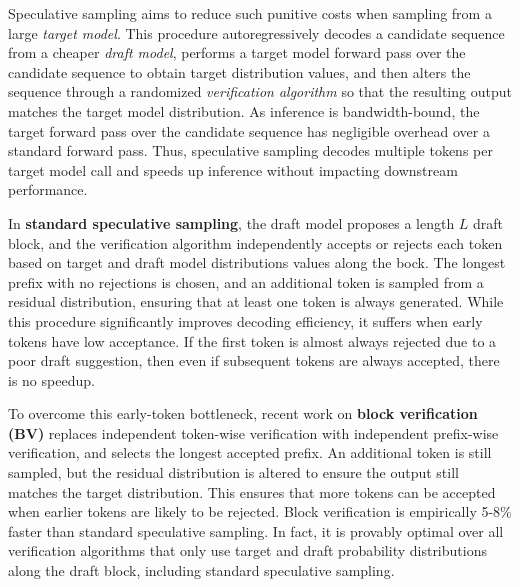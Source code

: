 \documentclass{article}
\theoremstyle{plain}
\theoremstyle{definition}
\theoremstyle{remark}
\begin{document}
Speculative sampling \citep{chen2023accelerating,leviathan2023fast} aims to reduce such punitive costs when sampling from a large \emph{target model}. This procedure autoregressively decodes a candidate sequence from a cheaper \emph{draft model}, performs a target model forward pass over the candidate sequence to obtain target distribution values, and then alters the sequence through a randomized \emph{verification algorithm} so that the resulting output matches the target model distribution. As inference is bandwidth-bound, the target forward pass over the candidate sequence has negligible overhead over a standard forward pass. Thus, speculative sampling decodes multiple tokens per target model call and speeds up inference without impacting downstream performance.

In \textbf{standard speculative sampling}, the draft model proposes a length $L$ draft block, and the verification algorithm independently accepts or rejects each token based on target and draft model distributions values along the bock. The longest prefix with no rejections is chosen, and an additional token is sampled from a residual distribution, ensuring that at least one token is always generated. While this procedure significantly improves decoding efficiency, it suffers when early tokens have low acceptance. If the first token is almost always rejected due to a poor draft suggestion, then even if subsequent tokens are always accepted, there is no speedup.

To overcome this early-token bottleneck, recent work on \textbf{block verification (BV)} \citep{sun2024block} replaces independent token-wise verification with independent prefix-wise verification, and selects the longest accepted prefix. An additional token is still sampled, but the residual distribution is altered to ensure the output still matches the target distribution. This ensures that more tokens can be accepted when earlier tokens are likely to be rejected. Block verification is empirically 5-8\% faster than standard speculative sampling. In fact, it is provably optimal over all verification algorithms that only use target and draft probability distributions along the draft block, including standard speculative sampling. 
\end{document}

